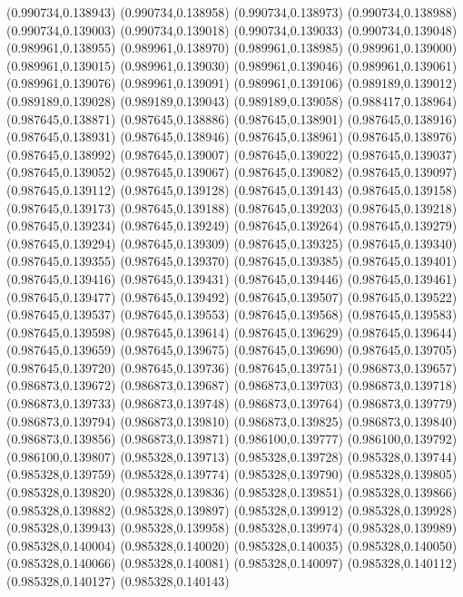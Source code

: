 (0.990734,0.138943)
(0.990734,0.138958)
(0.990734,0.138973)
(0.990734,0.138988)
(0.990734,0.139003)
(0.990734,0.139018)
(0.990734,0.139033)
(0.990734,0.139048)
(0.989961,0.138955)
(0.989961,0.138970)
(0.989961,0.138985)
(0.989961,0.139000)
(0.989961,0.139015)
(0.989961,0.139030)
(0.989961,0.139046)
(0.989961,0.139061)
(0.989961,0.139076)
(0.989961,0.139091)
(0.989961,0.139106)
(0.989189,0.139012)
(0.989189,0.139028)
(0.989189,0.139043)
(0.989189,0.139058)
(0.988417,0.138964)
(0.987645,0.138871)
(0.987645,0.138886)
(0.987645,0.138901)
(0.987645,0.138916)
(0.987645,0.138931)
(0.987645,0.138946)
(0.987645,0.138961)
(0.987645,0.138976)
(0.987645,0.138992)
(0.987645,0.139007)
(0.987645,0.139022)
(0.987645,0.139037)
(0.987645,0.139052)
(0.987645,0.139067)
(0.987645,0.139082)
(0.987645,0.139097)
(0.987645,0.139112)
(0.987645,0.139128)
(0.987645,0.139143)
(0.987645,0.139158)
(0.987645,0.139173)
(0.987645,0.139188)
(0.987645,0.139203)
(0.987645,0.139218)
(0.987645,0.139234)
(0.987645,0.139249)
(0.987645,0.139264)
(0.987645,0.139279)
(0.987645,0.139294)
(0.987645,0.139309)
(0.987645,0.139325)
(0.987645,0.139340)
(0.987645,0.139355)
(0.987645,0.139370)
(0.987645,0.139385)
(0.987645,0.139401)
(0.987645,0.139416)
(0.987645,0.139431)
(0.987645,0.139446)
(0.987645,0.139461)
(0.987645,0.139477)
(0.987645,0.139492)
(0.987645,0.139507)
(0.987645,0.139522)
(0.987645,0.139537)
(0.987645,0.139553)
(0.987645,0.139568)
(0.987645,0.139583)
(0.987645,0.139598)
(0.987645,0.139614)
(0.987645,0.139629)
(0.987645,0.139644)
(0.987645,0.139659)
(0.987645,0.139675)
(0.987645,0.139690)
(0.987645,0.139705)
(0.987645,0.139720)
(0.987645,0.139736)
(0.987645,0.139751)
(0.986873,0.139657)
(0.986873,0.139672)
(0.986873,0.139687)
(0.986873,0.139703)
(0.986873,0.139718)
(0.986873,0.139733)
(0.986873,0.139748)
(0.986873,0.139764)
(0.986873,0.139779)
(0.986873,0.139794)
(0.986873,0.139810)
(0.986873,0.139825)
(0.986873,0.139840)
(0.986873,0.139856)
(0.986873,0.139871)
(0.986100,0.139777)
(0.986100,0.139792)
(0.986100,0.139807)
(0.985328,0.139713)
(0.985328,0.139728)
(0.985328,0.139744)
(0.985328,0.139759)
(0.985328,0.139774)
(0.985328,0.139790)
(0.985328,0.139805)
(0.985328,0.139820)
(0.985328,0.139836)
(0.985328,0.139851)
(0.985328,0.139866)
(0.985328,0.139882)
(0.985328,0.139897)
(0.985328,0.139912)
(0.985328,0.139928)
(0.985328,0.139943)
(0.985328,0.139958)
(0.985328,0.139974)
(0.985328,0.139989)
(0.985328,0.140004)
(0.985328,0.140020)
(0.985328,0.140035)
(0.985328,0.140050)
(0.985328,0.140066)
(0.985328,0.140081)
(0.985328,0.140097)
(0.985328,0.140112)
(0.985328,0.140127)
(0.985328,0.140143)
